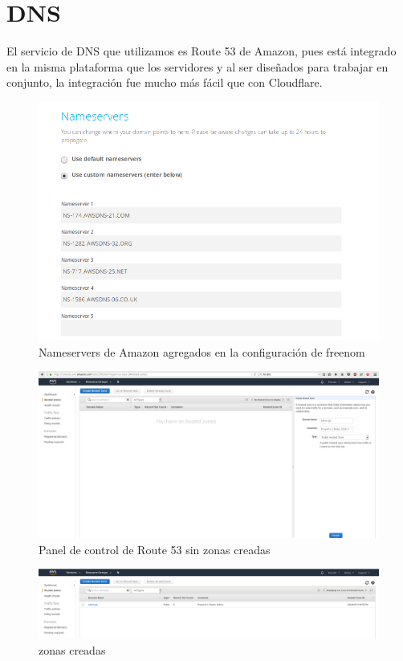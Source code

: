 \documentclass[9pt]{article}
\begin{document}
\section{DNS}
El servicio de \textsf{DNS} que utilizamos es \textsf{Route 53} de Amazon, pues está integrado en la misma plataforma que los servidores y al ser diseñados para trabajar en conjunto, la integración fue mucho más fácil que con Cloudflare.
\begin{figure}[H]
  \centering
  \includegraphics[width=0.8\linewidth]{nameservers}
  \caption{Nameservers de Amazon agregados en la configuración de freenom}
\end{figure}
\begin{figure}[H]
  \centering
  \includegraphics[width=0.8\linewidth]{DNS_management}
  \caption{Panel de control de Route 53 sin zonas creadas}
\end{figure}
\begin{figure}[H]
  \centering
  \includegraphics[width=0.8\linewidth]{HostedZones}
  \caption{zonas creadas}
\end{figure}
\end{document}
